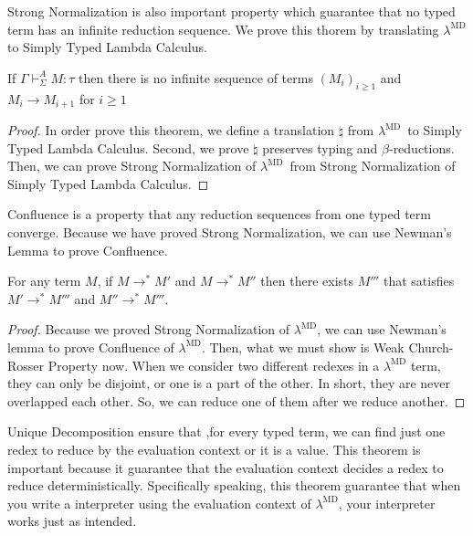 \documentclass[runningheads]{llncs}
\newcommand{\LMD}{$\lambda^{\textrm{MD}}$\xspace}
\newcommand{\G}{\Gamma}
\newcommand{\V}{\vdash_\Sigma}
\begin{document}

  Strong Normalization is also important property which guarantee that
  no typed term has an infinite reduction sequence.
  We prove this thorem by translating \LMD to Simply Typed Lambda Calculus.

  \begin{theorem}
      If $\G\V^A M:\tau$ then there is no infinite sequence of terms $(M_i)_{i\ge1}$ and 
      $M_i \longrightarrow M_{i+1}$ for $i\ge 1$
  \end{theorem}

  \begin{proof}
      In order prove this theorem, we define a translation $\natural$ from \LMD\ to Simply Typed Lambda Calculus.
      Second, we prove $\natural$ preserves typing and $\beta$-reductions.
      Then, we can prove Strong Normalization of \LMD\ from Strong Normalization of Simply Typed Lambda Calculus.
  \end{proof}

  Confluence is a property that any reduction sequences from one typed term converge.
  Because we have proved Strong Normalization, we can use Newman's Lemma to prove Confluence.

  \begin{theorem}[Confluence]
      For any term $M$, if $M \longrightarrow^* M'$ and $M \longrightarrow^* M''$ then
      there exists $M'''$ that satisfies $M' \longrightarrow^* M'''$ and $M'' \longrightarrow^* M'''$.
  \end{theorem}

  \begin{proof}
      Because we proved Strong Normalization of \LMD, 
      we can use Newman's lemma to prove Confluence of \LMD.
      Then, what we must show is Weak Church-Rosser Property now.
      When we consider two different redexes in a \LMD term, they can only be disjoint, or one is a part of the other.
      In short, they are never overlapped each other.
      So, we can reduce one of them after we reduce another.
  \end{proof}

  Unique Decomposition ensure that
  ,for every typed term, we can find just one redex to reduce by the evaluation context or it is a value.
  This theorem is important because it guarantee
  that the evaluation context decides a redex to reduce deterministically.
  Specifically speaking, this theorem guarantee that 
  when you write a interpreter using the evaluation context of \LMD,
  your interpreter works just as intended.
\end{document}
